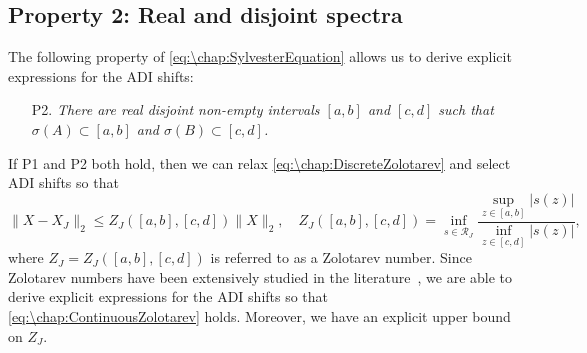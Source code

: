 \subsection*{Property 2: Real and disjoint spectra} 
The following property of \cref{eq:\chap:SylvesterEquation} allows us to derive explicit expressions for the ADI shifts:
\vspace{1em}
\begin{enumerate}
\item[P2.] \emph{There are real disjoint non-empty intervals $[a,b]$ and $[c,d]$ such that $\sigma(A) \subset [a,b]$ and $\sigma(B) \subset [c,d]$.}
\end{enumerate}
\vspace{1em}
If P1 and P2 both hold, then we can relax \cref{eq:\chap:DiscreteZolotarev} and select ADI shifts so that
 \begin{equation}
\|X-X_J\|_2 \leq  Z_J([a,b],[c,d])\|X\|_2, \quad Z_J([a,b],[c,d])=\inf_{s\in\mathcal{R}_{J}}\frac{\sup_{z\in[a,b]} \left|s(z)\right|}{\inf_{z\in[c,d]} \left|s(z)\right|},
\label{eq:\chap:ContinuousZolotarev}
\end{equation}
where $Z_J=Z_J([a,b],[c,d])$ is referred to as a Zolotarev number. Since Zolotarev numbers have been extensively studied in the literature~\cite{Beckermann_17_01,Lebedev_77_01,Lu_91_01,Zolotarev_1877_01}, we are able to derive explicit expressions for the ADI shifts so that \cref{eq:\chap:ContinuousZolotarev} holds. Moreover, we have an explicit upper bound on $Z_J$. 

